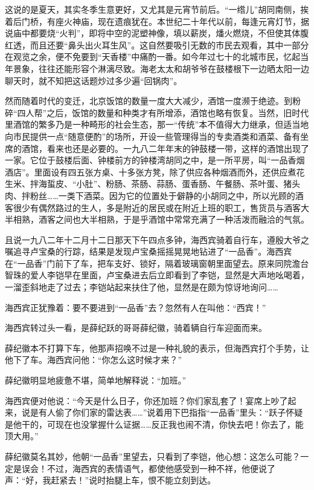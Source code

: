\par 这说的是夏天，其实冬季生意更好，又尤其是元宵节前后。“一绺儿”胡同南侧，挨着后门桥，有座火神庙，现在遗痕犹在。本世纪二十年代以前，每逢元宵灯节，据说庙中都要烧“火判”，即将中空的泥塑神像，填以薪炭，燔火燃烧，不但使其体腹红透，而且还要“鼻头出火耳生风”。这自然要吸引无数的市民去观看，其中一部分在观览之余，便不免要到“天香楼”中痛酌一番。如今年过七十的北城市民，忆起当年景象，往往还能形容个淋漓尽致。海老太太和胡爷爷在鼓楼根下一边晒太阳一边聊天时，就不知把这话题炒过多少遍“回锅肉”。
\par 然而随着时代的变迁，北京饭馆的数量一度大大减少，酒馆一度濒于绝迹。到粉碎“四人帮”之后，饭馆的数量和种类才有所增添，酒馆也略有恢复。当然，旧时代里酒馆的繁多乃是一种畸形的社会生态，那一“传统”本不值得大力继承，但适当地向市民提供一点“随意便酌”的场所，开设一些管理得当的专卖酒类和酒菜、备有坐席的酒馆，看来也还是必要的。一九八二年年末的钟鼓楼一带，这样的酒馆出现了一家。它位于鼓楼后面、钟楼前方的钟楼湾胡同之中，是一所平房，叫“一品香烟酒店”。里面设有四五张方桌、十多张方凳，除了供应各种烟酒而外，还供应煮花生米、拌海蜇皮、“小肚”、粉肠、茶肠、蒜肠、蛋香肠、午餐肠、茶叶蛋、猪头肉、拌粉丝……一类下酒菜。因为它的位置处于僻静的小胡同之中，所以光顾的酒客很少有偶然路过的生人，多是附近的居民或在附近上班的职工，售货员与酒客大半相熟，酒客之间也大半相熟，于是乎酒馆中常常充满了一种活泼而融洽的气氛。
\par 且说一九八二年十二月十二日那天下午四点多钟，海西宾骑着自行车，遵殷大爷之嘱追寻卢宝桑的行踪，结果是发现卢宝桑摇摇晃晃地钻进了“一品香”。海西宾在“一品香”门前下了车，把车支好、锁好，隔着玻璃窗朝里面望去。原来同院澹台智珠的爱人李铠早在里面，卢宝桑进去后立即看到了李铠，显然是大声地吆喝着，一溜歪斜地走了过去；李铠站起来扶住了他，显然是在颇为惊讶地询问……
\par 海西宾正犹豫着：要不要进到“一品香”去？忽然有人在叫他：“西宾！”
\par 海西宾转过头一看，是薛纪跃的哥哥薛纪徽，骑着辆自行车迎面而来。
\par 薛纪徽本不打算下车，他那声招唤不过是一种礼貌的表示，但海西宾打个手势，让他下了车。海西宾问他：“你怎么这时候才来？”
\par 薛纪徽明显地疲惫不堪，简单地解释说：“加班。”
\par 海西宾便对他说：“今天是什么日子，你还加班？你们家乱套了！宴席上吵了起来，说是有人偷了你们家的雷达表……”说着用下巴指指“一品香”里头：“跃子怀疑是他干的，可现在也没掌握什么证据……反正我也闹不清，你快去吧！你去了，能顶大用。”
\par 薛纪徽莫名其妙，他朝“一品香”里望去，只看到了李铠，他心想：这怎么可能？一定是误会！不过，海西宾的表情语气，都使他感受到一种不祥，他便说了声：“好，我赶紧去！”说时抬腿上车，恨不能立刻到达。
